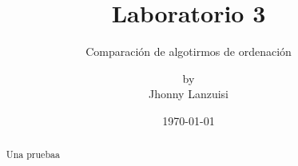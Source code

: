 \documentclass{scrartcl}
\begin{document}
%
\title{Laboratorio 3}
\subtitle{Comparación de algotirmos de ordenación}
\subject{Laboratorio de Algoritmos y Estructuras II}
\titlehead{Universidad Simón Bolívar\hfill Caracas, Venezuela}
\author{by \\ Jhonny Lanzuisi}
\date{\today}
\maketitle

\begin{abstract}
    Una pruebaa
\end{abstract}


\end{document}
